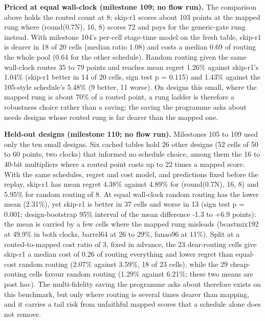 \documentclass[conference]{IEEEtran}
\begin{document}
\textbf{Priced at equal wall-clock (milestone 109; no flow run).} The
comparison above holds the routed count at 8; skip-r1 scores about 103
points at the mapped rung where (round(0.7N), 16, 8) scores 72 and pays
for the generic-gate rung instead. With milestone 104's per-cell
stage-time model on the fresh table, skip-r1 is dearer in 18 of 20 cells
(median ratio 1.08) and costs a median 0.69 of routing the whole pool
(0.64 for the other schedule). Random routing given the same wall-clock
routes 35 to 79 points and reaches mean regret 1.26\% against skip-r1's
1.04\% (skip-r1 better in 14 of 20 cells, sign test p = 0.115) and
1.43\% against the 105-style schedule's 5.48\% (9 better, 11 worse). On
designs this small, where the mapped rung is about 70\% of a routed
point, a rung ladder is therefore a robustness choice rather than a
saving; the saving the programme asks about needs designs whose routed
rung is far dearer than the mapped one.

\textbf{Held-out designs (milestone 110; no flow run).} Milestones 105
to 109 used only the ten small designs. Six cached tables hold 26 other
designs (52 cells of 50 to 60 points, two clocks) that informed no
schedule choice, among them the 16 to 40-bit multipliers where a routed
point costs up to 22 times a mapped score. With the same schedules,
regret and cost model, and predictions fixed before the replay, skip-r1
has mean regret 4.38\% against 4.89\% for (round(0.7N), 16, 8) and
5.95\% for random routing of 8. At equal wall-clock random routing has
the lower mean (2.31\%), yet skip-r1 is better in 37 cells and worse in
13 (sign test p = 0.001; design-bootstrap 95\% interval of the mean
difference -1.3 to +6.9 points): the mean is carried by a few cells
where the mapped rung misleads (bcastmix192 at 49.9\% in both clocks,
barrel64 at 26 to 29\%, fanao96 at 11\%). Split at a routed-to-mapped
cost ratio of 3, fixed in advance, the 23 dear-routing cells give
skip-r1 a median cost of 0.26 of routing everything and lower regret
than equal-cost random routing (2.07\% against 3.59\%, 18 of 23 cells),
while the 29 cheap-routing cells favour random routing (1.29\% against
6.21\%; these two means are post hoc). The multi-fidelity saving the
programme asks about therefore exists on this benchmark, but only where
routing is several times dearer than mapping, and it carries a tail risk
from unfaithful mapped scores that a schedule alone does not remove.
\end{document}
